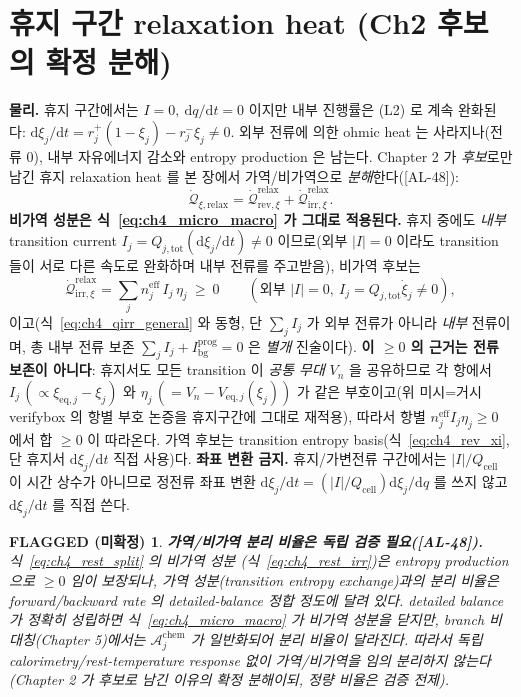 \documentclass[11pt,a4paper]{article}
\newtheorem*{flagbox}{FLAGGED (미확정)}
\newcommand{\dd}{\mathrm{d}}
\newcommand{\eff}{\mathrm{eff}}
\newcommand{\eq}{\mathrm{eq}}
\newcommand{\bg}{\mathrm{bg}}
\newcommand{\cell}{\mathrm{cell}}
\newcommand{\tot}{\mathrm{tot}}
\newcommand{\irr}{\mathrm{irr}}
\newcommand{\rev}{\mathrm{rev}}
\newcommand{\rlx}{\mathrm{relax}}
\newcommand{\prog}{\mathrm{prog}}
\newcommand{\chem}{\mathrm{chem}}
\newcommand{\AL}[1]{\textsf{[AL-#1]}}
\begin{document}
\section{휴지 구간 relaxation heat (Ch2 후보의 확정 분해)}\label{sec:ch4_rest}
\textbf{물리.} 휴지 구간에서는 $I=0,\ \dd q/\dd t=0$ 이지만 내부 진행률은 (L2) 로 계속 완화된다:
$\dd\xi_j/\dd t=r_j^+(1-\xi_j)-r_j^-\xi_j\ne0$. 외부 전류에 의한 ohmic heat 는 사라지나(전류 $0$), 내부
자유에너지 감소와 entropy production 은 남는다. Chapter 2 가 \emph{후보}로만 남긴 휴지 relaxation heat 를
본 장에서 가역/비가역으로 \emph{분해}한다(\AL{48}):
\begin{equation}
\dot{\mathcal Q}_{\xi,\rlx}=\dot{\mathcal Q}_{\rev,\xi}^{\rlx}+\dot{\mathcal Q}_{\irr,\xi}^{\rlx}.
\label{eq:ch4_rest_split}
\end{equation}
\textbf{비가역 성분은 식~\eqref{eq:ch4_micro_macro} 가 그대로 적용된다.} 휴지 중에도 \emph{내부} transition
current $I_j=Q_{j,\tot}(\dd\xi_j/\dd t)\ne0$ 이므로(외부 $|I|=0$ 이라도 transition 들이 서로 다른 속도로
완화하며 내부 전류를 주고받음), 비가역 후보는
\begin{equation}
\dot{\mathcal Q}_{\irr,\xi}^{\rlx}=\sum_j n_j^{\eff}\,I_j\,\eta_j\ \ge\ 0\qquad(\text{외부 }|I|=0,\ I_j=Q_{j,\tot}\dot\xi_j\ne0),
\label{eq:ch4_rest_irr}
\end{equation}
이고(식~\eqref{eq:ch4_qirr_general} 와 동형, 단 $\sum_j I_j$ 가 외부 전류가 아니라 \emph{내부} 전류이며, 총 내부
전류 보존 $\sum_j I_j+I_\bg^{\prog}=0$ 은 \emph{별개} 진술이다). \textbf{이 $\ge0$ 의 근거는 전류 보존이 아니다}:
휴지서도 모든 transition 이 \emph{공통 무대} $V_n$ 을 공유하므로 각 항에서 $I_j\,(\propto\xi_{\eq,j}-\xi_j)$ 와
$\eta_j\,(=V_n-V_{\eq,j}(\xi_j))$ 가 같은 부호이고(위 미시=거시 verifybox 의 항별 부호 논증을 휴지구간에 그대로
재적용), 따라서 항별 $n_j^{\eff}I_j\eta_j\ge0$ 에서 합 $\ge0$ 이 따라온다. 가역 후보는 transition entropy
basis(식~\eqref{eq:ch4_rev_xi}, 단 휴지서 $\dd\xi_j/\dd t$ 직접 사용)다. \textbf{좌표 변환 금지.} 휴지/가변전류 구간에서는 $|I|/Q_\cell$ 이 시간 상수가
아니므로 정전류 좌표 변환 $\dd\xi_j/\dd t=(|I|/Q_\cell)\dd\xi_j/\dd q$ 를 쓰지 않고 $\dd\xi_j/\dd t$ 를 직접 쓴다.
\begin{flagbox}
\textbf{가역/비가역 분리 비율은 독립 검증 필요(\AL{48}).} 식~\eqref{eq:ch4_rest_split} 의 비가역 성분
(식~\eqref{eq:ch4_rest_irr})은 entropy production 으로 $\ge0$ 임이 보장되나, 가역 성분(transition entropy
exchange)과의 \emph{분리 비율}은 forward/backward rate 의 detailed-balance 정합 정도에 달려 있다. detailed
balance 가 정확히 성립하면 식~\eqref{eq:ch4_micro_macro} 가 비가역 성분을 닫지만, branch 비대칭(Chapter 5)에서는
$\mathcal A_j^{\chem}$ 가 일반화되어 분리 비율이 달라진다. 따라서 독립 calorimetry/rest-temperature response
없이 가역/비가역을 임의 분리하지 않는다(Chapter 2 가 후보로 남긴 이유의 확정 분해이되, \emph{정량} 비율은
검증 전제).
\end{flagbox}
\end{document}
